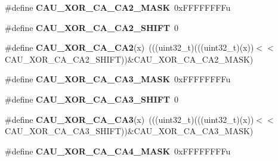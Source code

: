 \begin{DoxyCompactItemize}
\item 
\#define {\bfseries C\+A\+U\+\_\+\+X\+O\+R\+\_\+\+C\+A\+\_\+\+C\+A2\+\_\+\+M\+A\+SK}~0x\+F\+F\+F\+F\+F\+F\+F\+Fu\hypertarget{group__CAU__Register__Masks_ga710ad3a23664ea7f219a37d7a5402362}{}\label{group__CAU__Register__Masks_ga710ad3a23664ea7f219a37d7a5402362}

\item 
\#define {\bfseries C\+A\+U\+\_\+\+X\+O\+R\+\_\+\+C\+A\+\_\+\+C\+A2\+\_\+\+S\+H\+I\+FT}~0\hypertarget{group__CAU__Register__Masks_gaaa37d49b203514cc1d0d59ef3dc5d4b0}{}\label{group__CAU__Register__Masks_gaaa37d49b203514cc1d0d59ef3dc5d4b0}

\item 
\#define {\bfseries C\+A\+U\+\_\+\+X\+O\+R\+\_\+\+C\+A\+\_\+\+C\+A2}(x)~(((uint32\+\_\+t)(((uint32\+\_\+t)(x))$<$$<$C\+A\+U\+\_\+\+X\+O\+R\+\_\+\+C\+A\+\_\+\+C\+A2\+\_\+\+S\+H\+I\+FT))\&C\+A\+U\+\_\+\+X\+O\+R\+\_\+\+C\+A\+\_\+\+C\+A2\+\_\+\+M\+A\+SK)\hypertarget{group__CAU__Register__Masks_ga14a8b8358657a8eceb13d03a4204b01a}{}\label{group__CAU__Register__Masks_ga14a8b8358657a8eceb13d03a4204b01a}

\item 
\#define {\bfseries C\+A\+U\+\_\+\+X\+O\+R\+\_\+\+C\+A\+\_\+\+C\+A3\+\_\+\+M\+A\+SK}~0x\+F\+F\+F\+F\+F\+F\+F\+Fu\hypertarget{group__CAU__Register__Masks_gac7b046ce31fba66e970b3459c24a10f9}{}\label{group__CAU__Register__Masks_gac7b046ce31fba66e970b3459c24a10f9}

\item 
\#define {\bfseries C\+A\+U\+\_\+\+X\+O\+R\+\_\+\+C\+A\+\_\+\+C\+A3\+\_\+\+S\+H\+I\+FT}~0\hypertarget{group__CAU__Register__Masks_ga524188c17d8d070ce35b78f3a1bd8d89}{}\label{group__CAU__Register__Masks_ga524188c17d8d070ce35b78f3a1bd8d89}

\item 
\#define {\bfseries C\+A\+U\+\_\+\+X\+O\+R\+\_\+\+C\+A\+\_\+\+C\+A3}(x)~(((uint32\+\_\+t)(((uint32\+\_\+t)(x))$<$$<$C\+A\+U\+\_\+\+X\+O\+R\+\_\+\+C\+A\+\_\+\+C\+A3\+\_\+\+S\+H\+I\+FT))\&C\+A\+U\+\_\+\+X\+O\+R\+\_\+\+C\+A\+\_\+\+C\+A3\+\_\+\+M\+A\+SK)\hypertarget{group__CAU__Register__Masks_ga1cabdcb13efdab3f163c0d3b605585f0}{}\label{group__CAU__Register__Masks_ga1cabdcb13efdab3f163c0d3b605585f0}

\item 
\#define {\bfseries C\+A\+U\+\_\+\+X\+O\+R\+\_\+\+C\+A\+\_\+\+C\+A4\+\_\+\+M\+A\+SK}~0x\+F\+F\+F\+F\+F\+F\+F\+Fu\hypertarget{group__CAU__Register__Masks_gac44f628ba27da8192d8e570f745e5a0d}{}\label{group__CAU__Register__Masks_gac44f628ba27da8192d8e570f745e5a0d}


\end{DoxyCompactItemize}

